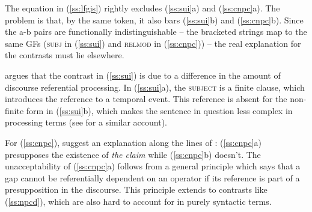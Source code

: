\documentclass[output=paper,hidelinks]{langscibook}
\begin{document}
The equation in (\ref{ss:lfgis}) rightly excludes (\ref{ss:sui}a) and (\ref{ss:cnpc}a). The problem is that, by the same token, it also bars (\ref{ss:sui}b) and (\ref{ss:cnpc}b). Since the a-b pairs are functionally indistinguishable -- the bracketed strings map to the same GFs (\textsc{subj} in (\ref{ss:sui}) and \textsc{relmod} in (\ref{ss:cnpc})) -- the real explanation for the contrasts must lie elsewhere.

\citet{kluender2004subject} argues that the contrast in (\ref{ss:sui}) is due to a difference in the amount of discourse referential processing. In (\ref{ss:sui}a), the \textsc{subject} is a finite clause, which introduces the reference to a temporal event. This reference is absent for the non-finite form in  (\ref{ss:sui}b), which makes the sentence in question less complex in processing terms (see \citet{gibson2000the-dependency} for a similar account).

For (\ref{ss:cnpc}), \citet{culicover2005simpler} suggest an explanation along the lines of \citet{kroch1998amount}: (\ref{ss:cnpc}a) presupposes the existence of \textit{the claim} while (\ref{ss:cnpc}b) doesn't. The unacceptability of (\ref{ss:cnpc}a)  follows from a general principle which says that a gap cannot be referentially dependent on an operator if its reference is part of a presupposition in the discourse. This principle extends to contrasts like (\ref{ss:npcd}), which are also hard to account for in purely syntactic terms.

\begin{exe}
\ex\label{ss:npcd}
\begin{xlist}
\end{xlist}
\end{exe}
\end{document}
